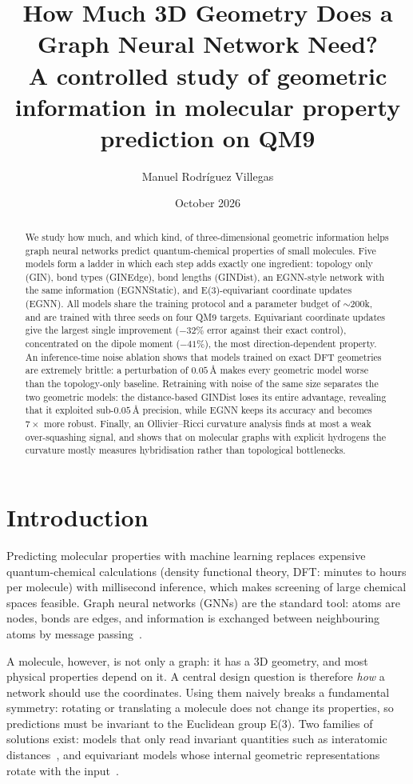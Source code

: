 \documentclass[11pt,a4paper]{article}
\title{\textbf{How Much 3D Geometry Does a Graph Neural Network Need?}\\[4pt]
\large A controlled study of geometric information in molecular property prediction on QM9}
\author{Manuel Rodr\'iguez Villegas}
\date{October 2026}
\begin{document}
\maketitle

\begin{abstract}
\noindent
We study how much, and which kind, of three-dimensional geometric information helps graph
neural networks predict quantum-chemical properties of small molecules. Five models form a
ladder in which each step adds exactly one ingredient: topology only (GIN), bond types
(GINEdge), bond lengths (GINDist), an EGNN-style network with the same information
(EGNNStatic), and E(3)-equivariant coordinate updates (EGNN). All models share the training
protocol and a parameter budget of $\sim$200k, and are trained with three seeds on four QM9
targets. Equivariant coordinate updates give the largest single improvement ($-32\%$ error
against their exact control), concentrated on the dipole moment ($-41\%$), the most
direction-dependent property. An inference-time noise ablation shows that models trained
on exact DFT geometries are extremely brittle: a perturbation of $0.05$\,\AA{} makes every
geometric model worse than the topology-only baseline. Retraining with noise of the same
size separates the two geometric models: the distance-based GINDist loses its entire
advantage, revealing that it exploited sub-$0.05$\,\AA{} precision, while EGNN keeps its
accuracy and becomes $7\times$ more robust. Finally, an Ollivier--Ricci curvature analysis
finds at most a weak over-squashing signal, and shows that on molecular graphs with explicit
hydrogens the curvature mostly measures hybridisation rather than topological bottlenecks.
\end{abstract}

\section{Introduction}

Predicting molecular properties with machine learning replaces expensive quantum-chemical
calculations (density functional theory, DFT: minutes to hours per molecule) with
millisecond inference, which makes screening of large chemical spaces feasible. Graph neural
networks (GNNs) are the standard tool: atoms are nodes, bonds are edges, and information is
exchanged between neighbouring atoms by message passing~\cite{gilmer2017}.

A molecule, however, is not only a graph: it has a 3D geometry, and most physical properties
depend on it. A central design question is therefore \emph{how} a network should use the
coordinates. Using them naively breaks a fundamental symmetry: rotating or translating a
molecule does not change its properties, so predictions must be invariant to the Euclidean
group E(3). Two families of solutions exist: models that only read invariant quantities such
as interatomic distances~\cite{schutt2017}, and equivariant models whose internal geometric
representations rotate with the input~\cite{satorras2021}.
\end{document}
